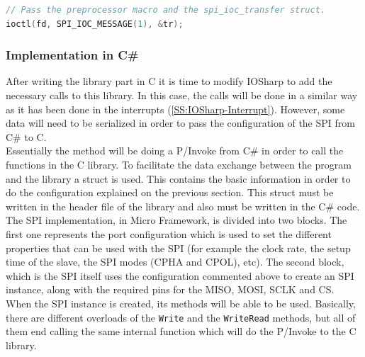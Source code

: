 \begin{lstlisting}[language=C, caption={IOSharp.c - SPI transfer}]
// Pass the preprocessor macro and the spi_ioc_transfer struct.
ioctl(fd, SPI_IOC_MESSAGE(1), &tr);
\end{lstlisting}

\subsubsection{Implementation in C\#}\label{SSS:IOSharp-SPI-Implementation-CSharp}
After writing the library part in C it is time to modify IOSharp to add the necessary calls to this library. In this case, the calls will be done in a similar way as it has been done in the interrupts (\ref{SS:IOSharp-Interrupt}). However, some data will need to be serialized in order to pass the configuration of the SPI from C\# to C.
\\
Essentially the method will be doing a P/Invoke from C\# in order to call the functions in the C library. To facilitate the data exchange between the program and the library a struct is used. This contains the basic information in order to do the configuration explained on the previous section. This struct must be written in the header file of the library and also must be written in the C\# code. The SPI implementation, in Micro Framework, is divided into two blocks. The first one represents the port configuration which is used to set the different properties that can be used with the SPI (for example the clock rate, the setup time of the slave, the SPI modes (CPHA and CPOL), etc). The second block, which is the SPI itself uses the configuration commented above to create an SPI instance, along with the required pins for the \gls{MISO}, \gls{MOSI}, \gls{SCLK} and \gls{CS}.
\\
When the SPI instance is created, its methods will be able to be used. Basically, there are different overloads of the \verb!Write! and the \verb!WriteRead! methods, but all of them end calling the same internal function which will do the P/Invoke to the C library.

